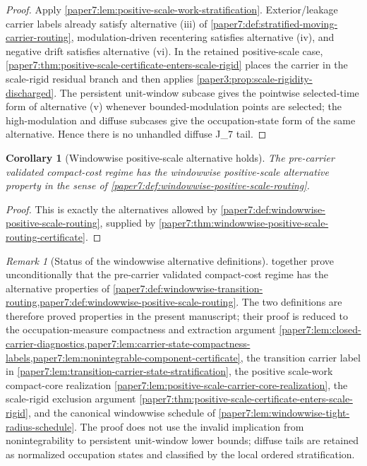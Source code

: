 \documentclass[11pt]{amsart}
\def\({}%
\def\){}%
\theoremstyle{plain}
\newtheorem{corollary}[corollary]{Corollary}
\theoremstyle{definition}
\theoremstyle{remark}
\newtheorem{remark}[remark]{Remark}
\begin{document}
\begin{proof}
Apply \cref{paper7:lem:positive-scale-work-stratification}.  Exterior/leakage
carrier labels already satisfy alternative \textup{(iii)} of
\cref{paper7:def:stratified-moving-carrier-routing}, modulation-driven
recentering satisfies alternative \textup{(iv)}, and negative drift satisfies
alternative \textup{(vi)}.  In the retained positive-scale case,
\cref{paper7:thm:positive-scale-certificate-enters-scale-rigid} places the
carrier in the scale-rigid residual branch and then applies
\cref{paper3:prop:scale-rigidity-discharged}.  The persistent unit-window
subcase gives the pointwise selected-time form of alternative \textup{(v)}
whenever bounded-modulation points are selected; the high-modulation and
diffuse subcases give the occupation-state form of the same alternative.  Hence
there is no unhandled diffuse \(J_7\) tail.
\end{proof}

\begin{corollary}[Windowwise positive-scale alternative holds]
\label{paper7:cor:windowwise-positive-scale-routing-holds}
The pre-carrier validated compact-cost regime has the windowwise
positive-scale alternative property in the sense of
\cref{paper7:def:windowwise-positive-scale-routing}.
\end{corollary}

\begin{proof}
This is exactly the alternatives allowed by
\cref{paper7:def:windowwise-positive-scale-routing}, supplied by
\cref{paper7:thm:windowwise-positive-scale-routing-certificate}.
\end{proof}

\begin{remark}[Status of the windowwise alternative definitions]
\label{paper7:rem:windowwise-routing-discharged}
together prove unconditionally that the pre-carrier validated compact-cost
regime has the alternative properties of
\cref{paper7:def:windowwise-transition-routing,paper7:def:windowwise-positive-scale-routing}.
The two definitions are therefore proved properties in the present manuscript;
their proof is reduced to
the occupation-measure compactness and extraction argument
\cref{paper7:lem:closed-carrier-diagnostics,paper7:lem:carrier-state-compactness-labels,paper7:lem:nonintegrable-component-certificate},
the transition carrier label in
\cref{paper7:lem:transition-carrier-state-stratification}, the positive
scale-work compact-core realization
\cref{paper7:lem:positive-scale-carrier-core-realization}, the scale-rigid
exclusion argument
\cref{paper7:thm:positive-scale-certificate-enters-scale-rigid}, and the
canonical windowwise schedule of
\cref{paper7:lem:windowwise-tight-radius-schedule}.  The proof does not use
the invalid implication from nonintegrability to persistent unit-window lower
bounds; diffuse tails are retained as normalized occupation states and classified by
the local ordered stratification.
\end{remark}
\end{document}
